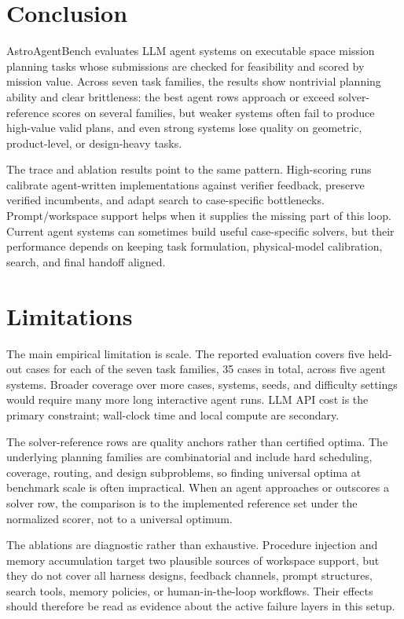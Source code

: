 \documentclass[11pt]{article}
\begin{document}
\section{Conclusion}
\label{sec:conclusion}

AstroAgentBench evaluates LLM agent systems on executable space mission planning tasks whose submissions are checked for feasibility and scored by mission value. Across seven task families, the results show nontrivial planning ability and clear brittleness: the best agent rows approach or exceed solver-reference scores on several families, but weaker systems often fail to produce high-value valid plans, and even strong systems lose quality on geometric, product-level, or design-heavy tasks.

The trace and ablation results point to the same pattern. High-scoring runs calibrate agent-written implementations against verifier feedback, preserve verified incumbents, and adapt search to case-specific bottlenecks. Prompt/workspace support helps when it supplies the missing part of this loop. Current agent systems can sometimes build useful case-specific solvers, but their performance depends on keeping task formulation, physical-model calibration, search, and final handoff aligned.

\section*{Limitations}

The main empirical limitation is scale. The reported evaluation covers five held-out cases for each of the seven task families, 35 cases in total, across five agent systems. Broader coverage over more cases, systems, seeds, and difficulty settings would require many more long interactive agent runs. LLM API cost is the primary constraint; wall-clock time and local compute are secondary.

The solver-reference rows are quality anchors rather than certified optima. The underlying planning families are combinatorial and include hard scheduling, coverage, routing, and design subproblems, so finding universal optima at benchmark scale is often impractical. When an agent approaches or outscores a solver row, the comparison is to the implemented reference set under the normalized scorer, not to a universal optimum.

The ablations are diagnostic rather than exhaustive. Procedure injection and memory accumulation target two plausible sources of workspace support, but they do not cover all harness designs, feedback channels, prompt structures, search tools, memory policies, or human-in-the-loop workflows. Their effects should therefore be read as evidence about the active failure layers in this setup.
\end{document}
